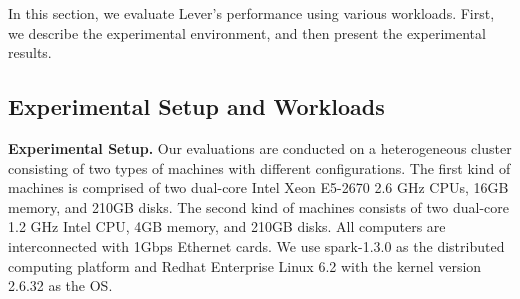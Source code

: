 \documentclass[10pt,conference,compsocconf,letterpaper]{IEEEtran}
\begin{document}
  In this section, we evaluate Lever's performance using various workloads. First, we describe the experimental environment, and then present the experimental results.

\subsection{Experimental Setup and Workloads}

  \textbf{Experimental Setup.} Our evaluations are conducted on a heterogeneous cluster consisting of two types of machines with different configurations. The first kind of machines is comprised of two dual-core Intel Xeon E5-2670 2.6 GHz CPUs, 16GB memory, and 210GB disks. The second kind of machines consists of two dual-core 1.2 GHz Intel CPU, 4GB memory, and 210GB disks. All computers are interconnected with 1Gbps Ethernet cards. We use spark-1.3.0 as the distributed computing platform and Redhat Enterprise Linux 6.2 with the kernel version 2.6.32 as the OS.
\end{document}
